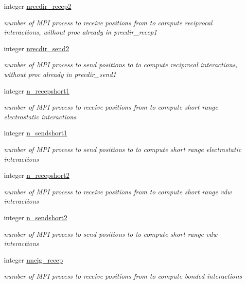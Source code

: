 \begin{DoxyCompactItemize}
integer \hyperlink{classdomdec_aa19f1045696509fac6e8b872424a332f}{nrecdir\-\_\-recep2}
\begin{DoxyCompactList}\small\item\em number of M\-P\-I process to receive positions from to compute reciprocal interactions, without proc already in precdir\-\_\-recep1 \end{DoxyCompactList}\item 
integer \hyperlink{classdomdec_a399f832dbe50a87ea3cfd222b65eabfb}{nrecdir\-\_\-send2}
\begin{DoxyCompactList}\small\item\em number of M\-P\-I process to send positions to to compute reciprocal interactions, without proc already in precdir\-\_\-send1 \end{DoxyCompactList}\item 
integer \hyperlink{classdomdec_a88b84c15a29f8f4e25738fffb5027497}{n\-\_\-recepshort1}
\begin{DoxyCompactList}\small\item\em number of M\-P\-I process to receive positions from to compute short range electrostatic interactions \end{DoxyCompactList}\item 
integer \hyperlink{classdomdec_a10cc7f1b63fcc120ac78969e44d907fa}{n\-\_\-sendshort1}
\begin{DoxyCompactList}\small\item\em number of M\-P\-I process to send positions to to compute short range electrostatic interactions \end{DoxyCompactList}\item 
integer \hyperlink{classdomdec_afdbf4a84ec151ba26b0b1112fc28b811}{n\-\_\-recepshort2}
\begin{DoxyCompactList}\small\item\em number of M\-P\-I process to receive positions from to compute short range vdw interactions \end{DoxyCompactList}\item 
integer \hyperlink{classdomdec_a2a12a88a8fa8070ba62c13604c01a8b7}{n\-\_\-sendshort2}
\begin{DoxyCompactList}\small\item\em number of M\-P\-I process to send positions to to compute short range vdw interactions \end{DoxyCompactList}\item 
integer \hyperlink{classdomdec_a364fed03b8d34d58abb5a2b4708ea05f}{nneig\-\_\-recep}
\begin{DoxyCompactList}\small\item\em number of M\-P\-I process to receive positions from to compute bonded interactions \end{DoxyCompactList}\item 

\end{DoxyCompactItemize}
